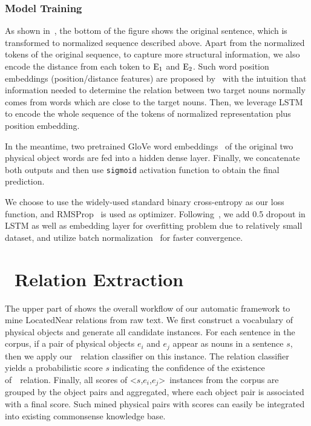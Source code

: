 \subsubsection{Model Training}
As shown in~, the bottom of the figure shows the original sentence, which is transformed to normalized sequence described above.
Apart from the normalized tokens of the original sequence, to capture more structural information, we also encode the distance from each token to $\textnormal E_1$ and $\textnormal E_2$.
{Such {word position embeddings} (position/distance features) are proposed by~\cite{zeng2014relation} with the intuition that information needed to determine the relation between two target nouns normally comes from words which are close to the target nouns.} 
Then, we leverage LSTM to encode the whole sequence of the tokens of normalized representation plus position embedding. 

In the meantime, two pretrained GloVe word embeddings~\cite{pennington2014glove} of the original two physical object words are fed into a hidden dense layer. 
Finally, we concatenate both outputs and then use \texttt{sigmoid} activation function to obtain the final prediction.

{We choose to use the widely-used standard binary cross-entropy as our loss function, and
	RMSProp~\cite{hinton2012neural} is used as optimizer. Following~\cite{zaremba2014recurrent}, we add 0.5 dropout in LSTM as well as embedding layer for overfitting problem due to relatively small dataset, and utilize batch normalization~\cite{ioffe2015batch,cooijmans2016recurrent} for faster convergence.}

\section{\lnear\  Relation Extraction}
\label{sec:mine}
The upper part of  shows the overall workflow of our automatic framework to mine LocatedNear relations from raw text.
We first construct a vocabulary of physical objects and generate all candidate instances. 
For each sentence in the corpus, if a pair of physical objects $e_i$ and $e_j$ appear as nouns in a sentence $s$, then we apply our~\lnear\ relation classifier on this instance. 
The relation classifier yields a probabilistic score $s$
indicating the confidence of the existence of~\lnear~relation.
Finally, all scores of \textless $s$,$e_i$,$e_j$\textgreater~instances from the corpus are grouped by the object pairs and aggregated, where each object
pair is associated with a final score. 
Such mined physical pairs with scores can easily be integrated into existing commonsense knowledge base.

